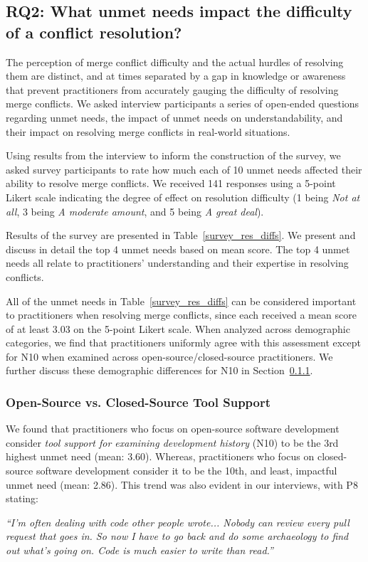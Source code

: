 \subsection{\textbf{RQ2:} What unmet needs impact the difficulty of a conflict resolution?}\label{RQ2}

The perception of merge conflict difficulty and the actual hurdles of resolving them are distinct, and at times separated by a gap in knowledge or awareness that prevent practitioners from accurately gauging the difficulty of resolving merge conflicts.
We asked interview participants a series of open-ended questions regarding unmet needs, the impact of unmet needs on understandability, and their impact on resolving merge conflicts in real-world situations.

Using results from the interview to inform the construction of the survey, we asked survey participants to rate how much each of 10 unmet needs affected their ability to resolve merge conflicts.
We received 141 responses using a 5-point Likert scale indicating the degree of effect on resolution difficulty (1 being \textit{Not at all}, 3 being \textit{A moderate amount}, and 5 being \textit{A great deal}).

Results of the survey are presented in Table~\ref{survey_res_diffs}.
We present and discuss in detail the top 4 unmet needs based on mean score.
The top 4 unmet needs all relate to practitioners' understanding and their expertise in resolving conflicts. 

All of the unmet needs in Table~\ref{survey_res_diffs} can be considered important to practitioners when resolving merge conflicts, since each received a mean score of at least 3.03 on the 5-point Likert scale.
When analyzed across demographic categories, we find that practitioners uniformly agree with this assessment except for N10 when examined across open-source/closed-source practitioners.
We further discuss these demographic differences for N10 in Section~\ref{oss_vs_closed_tool_support}.


\subsubsection{Open-Source vs. Closed-Source Tool Support}
\label{oss_vs_closed_tool_support}

We found that practitioners who focus on open-source software development consider \textit{tool support for examining development history} (N10) to be the 3rd highest unmet need (mean: 3.60).
Whereas, practitioners who focus on closed-source software development consider it to be the 10th, and least, impactful unmet need (mean: 2.86).
This trend was also evident in our interviews, with P8 stating:
\begin{displayquote}
\textit{``I'm often dealing with code other people wrote... Nobody can review every pull request that goes in. So now I have to go back and do some archaeology to find out what's going on. Code is much easier to write than read.''}
\end{displayquote}

